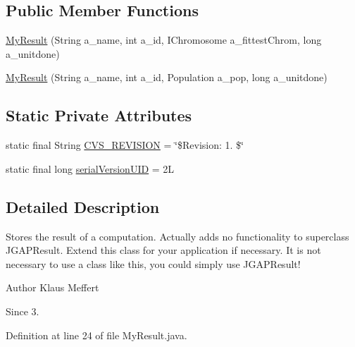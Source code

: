 \subsection*{Public Member Functions}
\begin{DoxyCompactItemize}
\item 
\hyperlink{classexamples_1_1grid_1_1fitness_distributed_1_1_my_result_a985b599ee904a4cae9d69704c69d1289}{My\-Result} (String a\-\_\-name, int a\-\_\-id, I\-Chromosome a\-\_\-fittest\-Chrom, long a\-\_\-unitdone)
\item 
\hyperlink{classexamples_1_1grid_1_1fitness_distributed_1_1_my_result_ad49985ff60d49e3e8aad8e4265a3ef67}{My\-Result} (String a\-\_\-name, int a\-\_\-id, Population a\-\_\-pop, long a\-\_\-unitdone)
\end{DoxyCompactItemize}
\subsection*{Static Private Attributes}
\begin{DoxyCompactItemize}
\item 
static final String \hyperlink{classexamples_1_1grid_1_1fitness_distributed_1_1_my_result_ad590af3be34a9a0a8e6800cde882285c}{C\-V\-S\-\_\-\-R\-E\-V\-I\-S\-I\-O\-N} = \char`\"{}\$Revision\-: 1. \$\char`\"{}
\item 
static final long \hyperlink{classexamples_1_1grid_1_1fitness_distributed_1_1_my_result_a4e7d45f91767860912acd33b329abc2f}{serial\-Version\-U\-I\-D} = 2\-L
\end{DoxyCompactItemize}


\subsection{Detailed Description}
Stores the result of a computation. Actually adds no functionality to superclass J\-G\-A\-P\-Result. Extend this class for your application if necessary. It is not necessary to use a class like this, you could simply use J\-G\-A\-P\-Result!

\begin{DoxyAuthor}{Author}
Klaus Meffert 
\end{DoxyAuthor}
\begin{DoxySince}{Since}
3. 
\end{DoxySince}


Definition at line 24 of file My\-Result.\-java.



